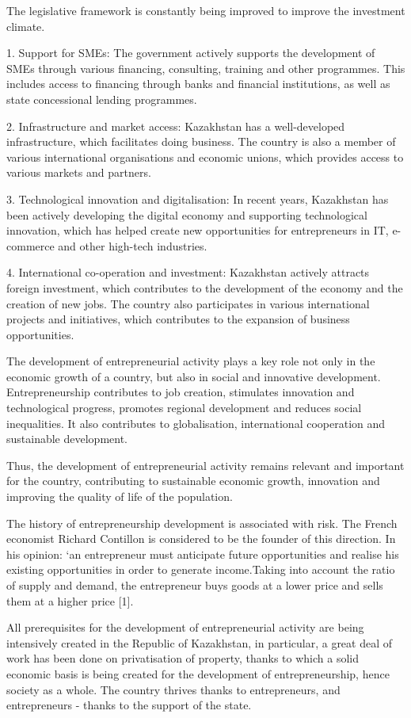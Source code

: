 \begin{multicols}{2}
The legislative framework is constantly being improved to improve the
investment climate.

1. Support for SMEs: The government actively supports the development of
SMEs through various financing, consulting, training and other
programmes. This includes access to financing through banks and
financial institutions, as well as state concessional lending
programmes.

2. Infrastructure and market access: Kazakhstan has a well-developed
infrastructure, which facilitates doing business. The country is also
a member of various international organisations and economic unions,
which provides access to various markets and partners.

3. Technological innovation and digitalisation: In recent years,
Kazakhstan has been actively developing the digital economy and
supporting technological innovation, which has helped create new
opportunities for entrepreneurs in IT, e-commerce and other high-tech
industries.

4. International co-operation and investment: Kazakhstan actively
attracts foreign investment, which contributes to the development of
the economy and the creation of new jobs. The country also
participates in various international projects and initiatives, which
contributes to the expansion of business opportunities.

The development of entrepreneurial activity plays a key role not only in
the economic growth of a country, but also in social and innovative
development. Entrepreneurship contributes to job creation, stimulates
innovation and technological progress, promotes regional development and
reduces social inequalities. It also contributes to globalisation,
international cooperation and sustainable development.

Thus, the development of entrepreneurial activity remains relevant and
important for the country, contributing to sustainable economic growth,
innovation and improving the quality of life of the population.

The history of entrepreneurship development is associated with risk. The
French economist Richard Contillon is considered to be the founder of
this direction. In his opinion: `an entrepreneur must anticipate future
opportunities and realise his existing opportunities in order to
generate income.Taking into account the ratio of supply and demand, the
entrepreneur buys goods at a lower price and sells them at a higher
price {[}1{]}.

All prerequisites for the development of entrepreneurial activity are
being intensively created in the Republic of Kazakhstan, in particular,
a great deal of work has been done on privatisation of property, thanks
to which a solid economic basis is being created for the development of
entrepreneurship, hence society as a whole. The country thrives thanks
to entrepreneurs, and entrepreneurs - thanks to the support of the
state.


\end{multicols}

